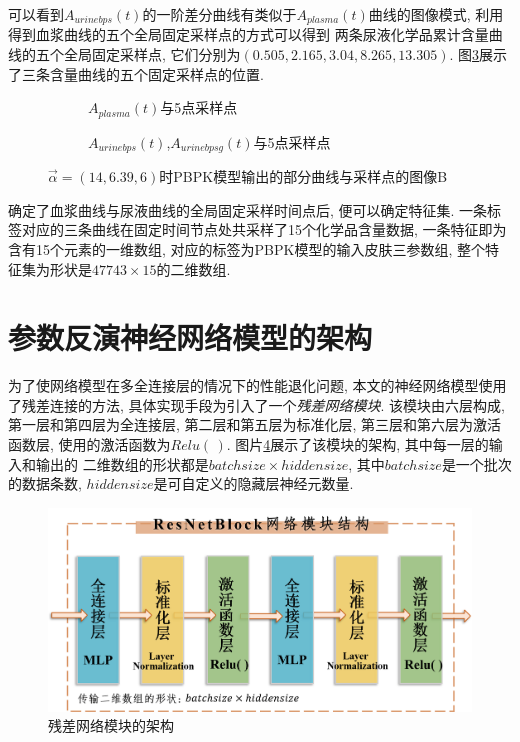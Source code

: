 \documentclass[a4paper,punct=banjiao,twoside]{ctexrep}
\theoremstyle{plain}
\theoremstyle{definition}
\theoremstyle{remark}
\begin{document}
可以看到$A_{urinebps}(t)$的一阶差分曲线有类似于$A_{plasma}(t)$曲线的图像模式, 利用得到血浆曲线的五个全局固定采样点的方式可以得到
两条尿液化学品累计含量曲线的五个全局固定采样点, 它们分别为$(0.505,2.165, 3.04 ,8.265,13.305)$. 图\ref{曲线与采样点5}展示了三条含量曲线的五个固定采样点的位置.

\begin{figure}[H]
  \centering
  \begin{subfigure}{0.45\textwidth}
    \centering
    \resizebox{1\textwidth}{!}{}
    \caption{$A_{plasma}(t)$与5点采样点}
    \label{曲线与采样点5a}
  \end{subfigure}
  \begin{subfigure}{0.45\textwidth}
    \centering
    \resizebox{1\textwidth}{!}{}
    \caption{$A_{urinebps}(t)$,$A_{urinebpsg}(t)$与5点采样点}
    \label{曲线与采样点5b}
  \end{subfigure}


  \caption{$\vec{\alpha}=(14,6.39,6)$时PBPK模型输出的部分曲线与采样点的图像B}
  \label{曲线与采样点5}
\end{figure}

确定了血浆曲线与尿液曲线的全局固定采样时间点后, 便可以确定特征集. 
一条标签对应的三条曲线在固定时间节点处共采样了15个化学品含量数据, 一条特征即为含有15个元素的一维数组, 对应的标签为PBPK模型的输入皮肤三参数组, 整个特征集为形状是$47743\times 15$的二维数组.


\section{参数反演神经网络模型的架构}

为了使网络模型在多全连接层的情况下的性能退化问题, 本文的神经网络模型使用了残差连接的方法, 具体实现手段为引入了一个\textit{残差网络模块}.
该模块由六层构成, 第一层和第四层为全连接层, 第二层和第五层为标准化层, 第三层和第六层为激活函数层, 使用的激活函数为$Relu(\,)$. 图片\ref{残差网络模块}展示了该模块的架构, 其中每一层的输入和输出的
二维数组的形状都是$batchsize \times hiddensize$, 其中$batchsize$是一个批次的数据条数, $hiddensize$是可自定义的隐藏层神经元数量. 
\begin{figure}[H]
  \centering
  \includegraphics[scale=0.45]{./figs/p5_1.png}
  \caption{残差网络模块的架构}
  \label{残差网络模块}
\end{figure}
\end{document}
